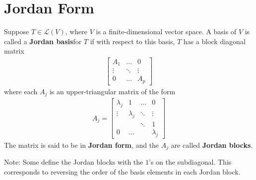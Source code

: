 \documentclass{memoir}
\begin{document}
\section{Jordan Form}
\label{sec:jordan_form}

\begin{defn}
	Suppose \(T \in \mathcal{L}(V)\), where \(V\) is a finite-dimensional vector space. A basis of \(V\) is called a \textbf{Jordan basis}for \(T\) if with respect to this basis, \(T\) has a block diagonal matrix
	\begin{align*}
		\begin{bmatrix} A_1 & \ldots & 0 \\ \vdots & \ddots & \vdots \\ 0 & \ldots & A_p \end{bmatrix} 
	\end{align*} 
	where each \(A_j\) is an upper-triangular matrix of the form
\begin{align*}
	A_j = \begin{bmatrix} \lambda_j & 1 & \ldots & 0 \\ \vdots &\lambda_j & \ddots & \vdots \\ & & \ddots & 1 \\ 0 & \ldots & & \lambda_j \end{bmatrix} 
\end{align*}
The matrix is said to be in \textbf{Jordan form}, and the \(A_j\) are called \textbf{Jordan blocks}.
\end{defn}
Note: Some define the Jordan blocks with the \(1\)'s on the subdiagonal. This corresponds to reversing the order of the basis elements in each Jordan block.
\end{document}
